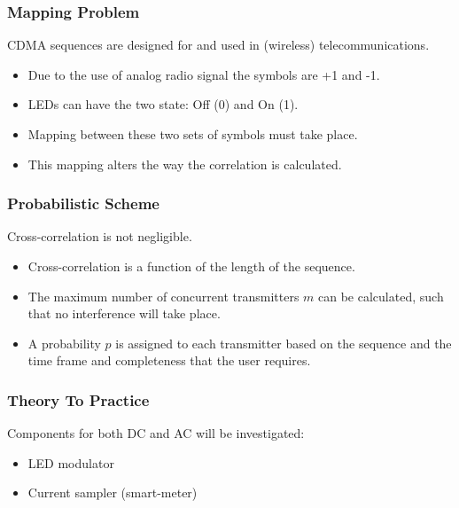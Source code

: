 \documentclass{beamer}
\begin{document}
	\begin{frame}\frametitle{Mapping Problem}
		CDMA sequences are designed for and used in (wireless) telecommunications.

		\begin{itemize}

			\item Due to the use of analog radio signal the symbols are +1 and -1.

			\item LEDs can have the two state: Off (0) and On (1).

			\item Mapping between these two sets of symbols must take place.

			\item This mapping alters the way the correlation is calculated.

		\end{itemize}
		
	\end{frame}


	\begin{frame}\frametitle{Probabilistic Scheme}
		Cross-correlation is not negligible.

		\begin{itemize}

			\item Cross-correlation is a function of the length of the sequence.

			\item The maximum number of concurrent transmitters $m$ can be calculated, such that no interference will take place. %

			\item A probability $p$ is assigned to each transmitter based on the sequence and the time frame and completeness that the user requires.

		\end{itemize}
	\end{frame}





	\begin{frame}\frametitle{Theory To Practice}

		Components for both DC and AC will be investigated: 

		\begin{itemize}

			\item LED modulator

			\item Current sampler (smart-meter)

		\end{itemize}
		
	\end{frame}
\end{document}
